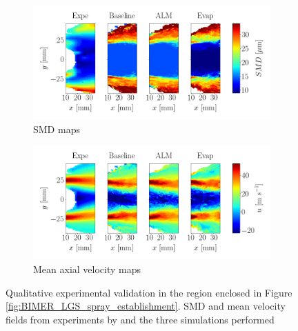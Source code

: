 \begin{figure}[h!]
\centering
\begin{subfigure}[b]{1.0\textwidth}
	\centering 
	\includegraphics[scale=0.7]{./part3_applications/figures_ch9_lagrangian/simus_expe_validation/subplots_maps_SMD.png}
   \caption{SMD maps}
\end{subfigure}

\vspace*{0.1in}

\begin{subfigure}[b]{1.0\textwidth}
	\centering
	\includegraphics[scale=0.7]{./part3_applications/figures_ch9_lagrangian/simus_expe_validation/subplots_maps_axial_velocity.png}
   \caption{Mean axial velocity maps}
\end{subfigure}
%
%
\caption[Qualitative experimental validation]{Qualitative experimental validation in the region enclosed in Figure \ref{fig:BIMER_LGS_spray_establishment}. SMD and mean velocity fields from experiments by  and the three simulations performed}
\label{fig:validation_BIMER_lgs}
\end{figure}

